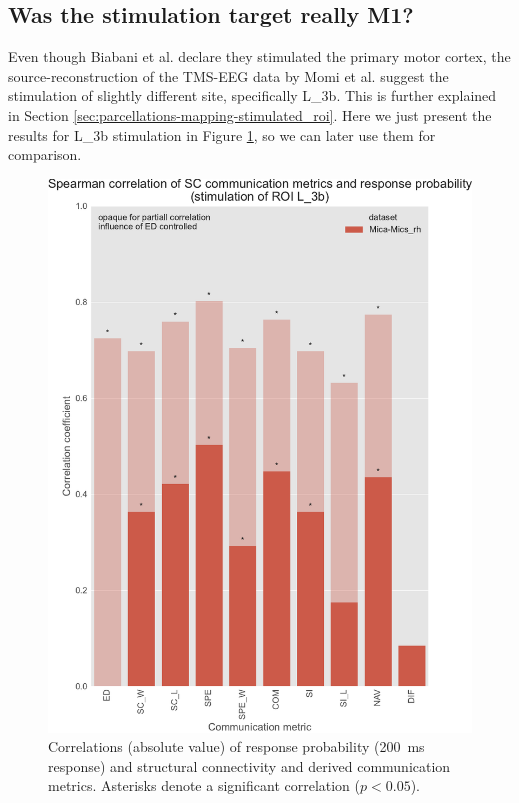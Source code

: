 \subsection{Was the stimulation target really M1?}

Even though Biabani et al. \cite{biabani_characterizing_2019} declare they stimulated the primary motor cortex, the source-reconstruction of the TMS-EEG data by Momi et al. \cite{momi_tms-evoked_2023} suggest the stimulation of slightly different site, specifically L\_3b. This is further explained in Section \ref{sec:parcellations-mapping-stimulated_roi}. Here we just present the results for L\_3b stimulation in Figure \ref{fig:ftract_mica_long_probabilities_L3b}, so we can later use them for comparison.

\begin{figure}
    \centering
    \includegraphics[width=\textwidth]{images/nootebook_generated/ftract_results_per_roi/long/MNI-HCP-MMP1/ED0/0.25/Spearman_correlation_of_SC_communication_metrics_and_response_probability_(stimulation_of_ROI_L_3b).pdf}
    \caption[F-Tract probability correlations - Mica-Mics\_rh L\_3b]{Correlations (absolute value) of response probability (200~ms response) and structural connectivity and derived communication metrics. Asterisks denote a significant correlation ($p<0.05$).}
    \label{fig:ftract_mica_long_probabilities_L3b}
\end{figure}

